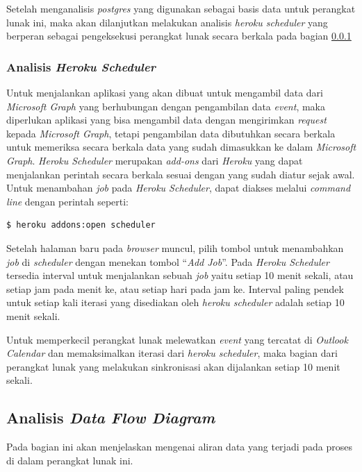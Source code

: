 Setelah menganalisis \textit{postgres} yang digunakan sebagai basis data untuk perangkat lunak ini, maka akan dilanjutkan melakukan analisis \textit{heroku scheduler} yang berperan sebagai pengeksekusi perangkat lunak secara berkala pada bagian \ref{sec:analisis_cron}

\subsubsection{Analisis \textit{Heroku Scheduler}}
\label{sec:analisis_cron}
Untuk menjalankan aplikasi yang akan dibuat untuk mengambil data dari \textit{Microsoft Graph} yang berhubungan dengan pengambilan data \textit{event}, maka diperlukan aplikasi yang bisa mengambil data dengan mengirimkan \textit{request} kepada \textit{Microsoft Graph}, tetapi pengambilan data dibutuhkan secara berkala untuk memeriksa secara berkala data yang sudah dimasukkan ke dalam \textit{Microsoft Graph}. \textit{Heroku Scheduler} merupakan \textit{add-ons} dari \textit{Heroku} yang dapat menjalankan perintah secara berkala sesuai dengan yang sudah diatur sejak awal. Untuk menambahan \textit{job} pada \textit{Heroku Scheduler}, dapat diakses melalui \textit{command line} dengan perintah seperti:

\begin{lstlisting}
$ heroku addons:open scheduler
\end{lstlisting}

Setelah halaman baru pada \textit{browser} muncul, pilih tombol untuk menambahkan \textit{job} di \textit{scheduler} dengan menekan tombol ``\textit{Add Job}''. Pada \textit{Heroku Scheduler} tersedia interval untuk menjalankan sebuah \textit{job} yaitu setiap 10 menit sekali, atau setiap jam pada menit ke, atau setiap hari pada jam ke. Interval paling pendek untuk setiap kali iterasi yang disediakan oleh \textit{heroku scheduler} adalah setiap 10 menit sekali. 

Untuk memperkecil perangkat lunak melewatkan \textit{event} yang tercatat di \textit{Outlook Calendar} dan memaksimalkan iterasi dari \textit{heroku scheduler}, maka bagian dari perangkat lunak yang melakukan sinkronisasi akan dijalankan setiap 10 menit sekali. 


\subsection{Analisis \textit{Data Flow Diagram}}

Pada bagian ini akan menjelaskan mengenai aliran data yang terjadi pada proses di dalam perangkat lunak ini.

